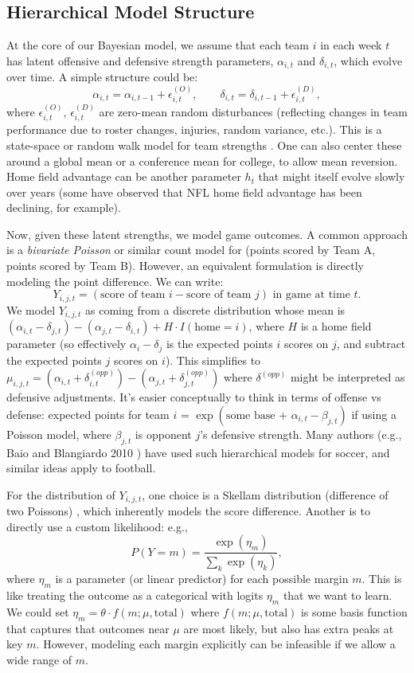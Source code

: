 \documentclass[12pt]{article}
\begin{document}
\subsection{Hierarchical Model Structure}
At the core of our Bayesian model, we assume that each team $i$ in each week $t$ has latent offensive and defensive strength parameters, $\alpha_{i,t}$ and $\delta_{i,t}$, which evolve over time. A simple structure could be:
\[ \alpha_{i,t} = \alpha_{i,t-1} + \epsilon_{i,t}^{(O)}, \qquad \delta_{i,t} = \delta_{i,t-1} + \epsilon_{i,t}^{(D)}, \]
where $\epsilon_{i,t}^{(O)}$, $\epsilon_{i,t}^{(D)}$ are zero-mean random disturbances (reflecting changes in team performance due to roster changes, injuries, random variance, etc.). This is a state-space or random walk model for team strengths \cite{Owen2011}. One can also center these around a global mean or a conference mean for college, to allow mean reversion. Home field advantage can be another parameter $h_t$ that might itself evolve slowly over years (some have observed that NFL home field advantage has been declining, for example).

Now, given these latent strengths, we model game outcomes. A common approach is a \emph{bivariate Poisson} or similar count model for (points scored by Team A, points scored by Team B). However, an equivalent formulation is directly modeling the point difference. We can write:
\[ Y_{i,j,t} = (\text{score of team } i - \text{score of team } j) \text{ in game at time } t. \]
We model $Y_{i,j,t}$ as coming from a discrete distribution whose mean is $(\alpha_{i,t} - \delta_{j,t}) - (\alpha_{j,t} - \delta_{i,t}) + H \cdot I(\text{home}=i)$, where $H$ is a home field parameter (so effectively $\alpha_{i} - \delta_{j}$ is the expected points $i$ scores on $j$, and subtract the expected points $j$ scores on $i$). This simplifies to $\mu_{i,j,t} = (\alpha_{i,t} + \delta_{i,t}^{(opp)}) - (\alpha_{j,t} + \delta_{j,t}^{(opp)})$ where $\delta^{(opp)}$ might be interpreted as defensive adjustments. It's easier conceptually to think in terms of offense vs defense: expected points for team $i$ = $\exp(\text{some base + }\alpha_{i,t} - \beta_{j,t})$ if using a Poisson model, where $\beta_{j,t}$ is opponent $j$'s defensive strength. Many authors (e.g., Baio and Blangiardo 2010 \cite{Baio2010}) have used such hierarchical models for soccer, and similar ideas apply to football.

For the distribution of $Y_{i,j,t}$, one choice is a Skellam distribution (difference of two Poissons) \cite{Karlis2009}, which inherently models the score difference. Another is to directly use a custom likelihood: e.g., 
\[ P(Y = m) = \frac{\exp(\eta_m)}{\sum_k \exp(\eta_k)}, \]
where $\eta_m$ is a parameter (or linear predictor) for each possible margin $m$. This is like treating the outcome as a categorical with logits $\eta_m$ that we want to learn. We could set $\eta_m = \theta \cdot f(m; \mu, \text{total})$ where $f(m; \mu, \text{total})$ is some basis function that captures that outcomes near $\mu$ are most likely, but also has extra peaks at key $m$. However, modeling each margin explicitly can be infeasible if we allow a wide range of $m$.
\end{document}
